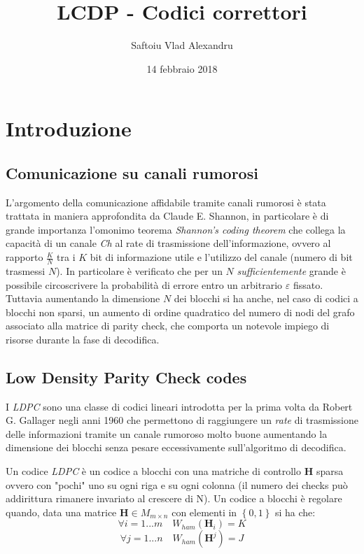 \documentclass{article}
\title{LCDP - Codici correttori}
\date{14 febbraio 2018}
\author{Saftoiu Vlad Alexandru}
\begin{document}
	\maketitle
	\newpage

	\tableofcontents
	\newpage

	\section{Introduzione}
	\subsection{Comunicazione su canali rumorosi}
	L'argomento della comunicazione affidabile tramite canali rumorosi è stata trattata in maniera approfondita da Claude E. Shannon, in particolare è di grande importanza l'omonimo teorema \textit{Shannon's coding theorem} che collega la capacità di un canale \textit{Ch} al rate di trasmissione dell'informazione, ovvero al rapporto $\frac{K}{N}$ tra i $K$ bit di informazione utile e l'utilizzo del canale (numero di bit trasmessi $N$). In particolare è verificato che per un $N$ \textit{sufficientemente} grande è possibile circoscrivere la probabilità di errore entro un arbitrario $\varepsilon$ fissato. Tuttavia aumentando la dimensione $N$ dei blocchi si ha anche, nel caso di codici a blocchi non sparsi, un aumento di ordine quadratico del numero di nodi del grafo associato alla matrice di parity check, che comporta un notevole impiego di risorse durante la fase di decodifica.
	\subsection {Low Density Parity Check codes}
	I \textit{LDPC} sono una classe di codici lineari introdotta per la prima volta da Robert G. Gallager negli anni 1960 che permettono di raggiungere un \textit{rate} di trasmissione delle informazioni tramite un canale rumoroso molto buone aumentando la dimensione dei blocchi senza pesare eccessivamente sull'algoritmo di decodifica.
	
	Un codice \textit{LDPC} è un codice a blocchi con una matriche di controllo $\textbf{H}$ sparsa ovvero con "pochi" uno su ogni riga e su ogni colonna (il numero dei checks può addirittura rimanere invariato al crescere di N). Un codice a blocchi è regolare quando, data una matrice $\textbf{H} \in M_{m \times n}$ con elementi in $\left\{0,1\right\}$ si ha che:
	\begin{equation}
		\forall i = 1 ... m \quad W_{ham}(\textbf{H}_i) = K
	\end{equation}
	\begin{equation}
		  \forall j =1 ... n \quad W_{ham}(\textbf{H}^j) = J 
	\end{equation}
	
\end{document}
